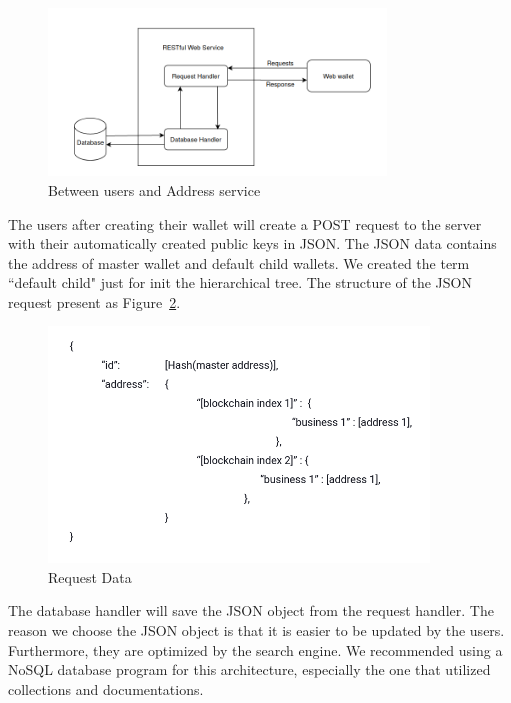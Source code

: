 \begin{figure}[!ht]
    \centering
    \includegraphics[width=0.8\textwidth]{images/design_uas.png}
    \caption[Between users and Address service]{Between users and Address service}
    \label{fig:uas}
\end{figure}

The users after creating their wallet will create a POST request to the server with their automatically created public keys in JSON.
The JSON data contains the address of master wallet and default child wallets.
We created the term ``default child" just for init the hierarchical tree.
The structure of the JSON request present as Figure~\ref{fig:json}.

\begin{figure}[!ht]
    \centering
    \includegraphics[width=0.9\textwidth]{images/design_json.png}
    \caption[Request Data]{Request Data}
    \label{fig:json}
\end{figure}

The database handler will save the JSON object from the request handler. The reason we choose the JSON object is that it is easier to be updated by the users. Furthermore, they are optimized by the search engine. We recommended using a NoSQL database program for this architecture, especially the one that utilized collections and documentations.


